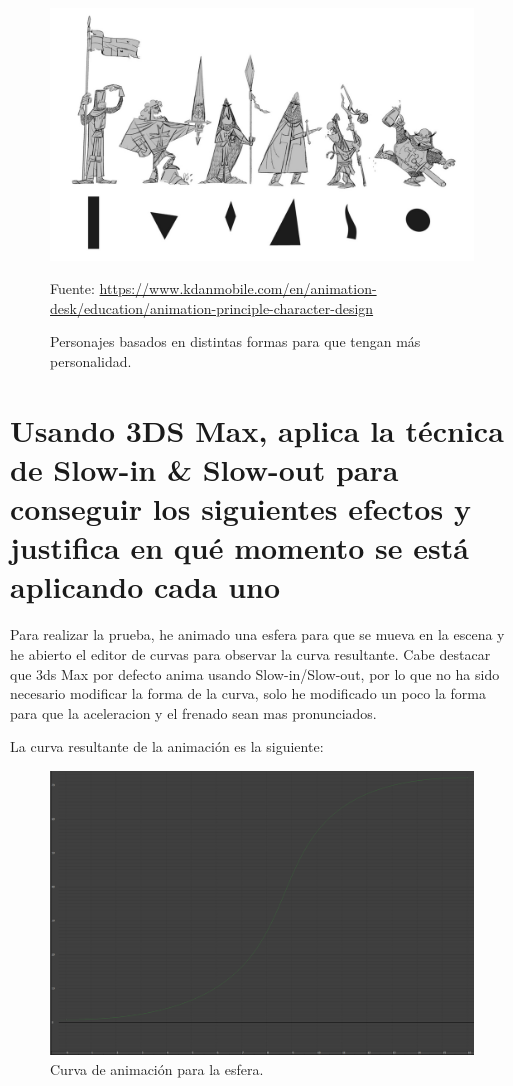 \documentclass{article}
\begin{document}
\begin{figure}[H]
    \centering
    \includegraphics[width=\textwidth]{imagenes/appeal.jpg}
    \caption{Personajes basados en distintas formas para que tengan más personalidad.}
    \vspace{10pt}
    \footnotesize{Fuente: \url{https://www.kdanmobile.com/en/animation-desk/education/animation-principle-character-design}}
\end{figure}

\section{Usando 3DS Max, aplica la técnica de Slow-in \& Slow-out para conseguir los siguientes efectos y justifica en qué momento se está aplicando cada uno}

Para realizar la prueba, he animado una esfera para que se mueva en la escena y he abierto el editor de curvas para observar la curva resultante. Cabe destacar que 3ds Max por defecto anima usando Slow-in/Slow-out, por lo que no ha sido necesario modificar la forma de la curva, solo he modificado un poco la forma para que la aceleracion y el frenado sean mas pronunciados.

\bigskip

La curva resultante de la animación es la siguiente:

\begin{figure}[H]
    \centering
    \includegraphics[width=\textwidth]{imagenes/curva.png}
    \caption{Curva de animación para la esfera.}
\end{figure}
\end{document}
